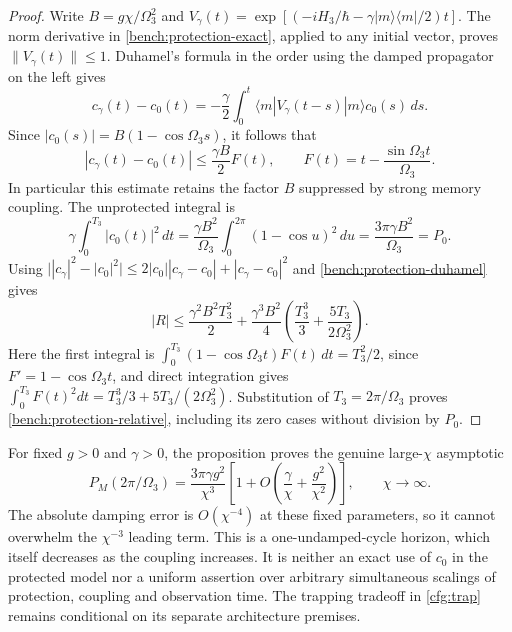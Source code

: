 \documentclass[11pt,oneside,openany]{book}
\theoremstyle{definition}
\theoremstyle{remark}\newtheorem{remark}[theorem]{Remark}
\begin{document}
\begin{proof}
Write $B=g\chi/\Omega_3^2$ and
$V_\gamma(t)=\exp[(-iH_3/\hbar-\gamma|m\rangle\langle m|/2)t]$.
The norm derivative in \eqref{bench:protection-exact}, applied to any
initial vector, proves $\|V_\gamma(t)\|\le1$. Duhamel's formula in the
order using the damped propagator on the left gives
\[
 c_\gamma(t)-c_0(t)
 =-\frac\gamma2\int_0^t
     \langle m|V_\gamma(t-s)|m\rangle c_0(s)\,ds.
\]
Since $|c_0(s)|=B(1-\cos\Omega_3s)$, it follows that
\begin{equation}
 |c_\gamma(t)-c_0(t)|\le\frac{\gamma B}{2}F(t),
 \qquad F(t)=t-\frac{\sin\Omega_3t}{\Omega_3}.
 \label{bench:protection-duhamel}
\end{equation}
In particular this estimate retains the factor $B$ suppressed by strong
memory coupling. The unprotected integral is
\[
 \gamma\int_0^{T_3}|c_0(t)|^2\,dt
  =\frac{\gamma B^2}{\Omega_3}
        \int_0^{2\pi}(1-\cos u)^2\,du
  =\frac{3\pi\gamma B^2}{\Omega_3}=P_0.
\]
Using $\bigl||c_\gamma|^2-|c_0|^2\bigr|
\le2|c_0||c_\gamma-c_0|+|c_\gamma-c_0|^2$ and
\eqref{bench:protection-duhamel} gives
\[
 |R|\le\frac{\gamma^2B^2T_3^2}{2}
       +\frac{\gamma^3B^2}{4}
            \left(\frac{T_3^3}{3}+\frac{5T_3}{2\Omega_3^2}\right).
\]
Here the first integral is
$\int_0^{T_3}(1-\cos\Omega_3t)F(t)\,dt=T_3^2/2$, since
$F'=1-\cos\Omega_3t$, and direct integration gives
$\int_0^{T_3}F(t)^2dt=T_3^3/3+5T_3/(2\Omega_3^2)$.
Substitution of $T_3=2\pi/\Omega_3$ proves
\eqref{bench:protection-relative}, including its zero cases without
division by $P_0$.
\end{proof}

For fixed $g>0$ and $\gamma>0$, the proposition proves the genuine
large-$\chi$ asymptotic
\begin{equation}
 P_M(2\pi/\Omega_3)
 =\frac{3\pi\gamma g^2}{\chi^3}
   \left[1+O\!\left(\frac\gamma\chi+\frac{g^2}{\chi^2}\right)\right],
 \qquad \chi\longrightarrow\infty.
 \label{bench:protection-asymptotic}
\end{equation}
The absolute damping error is $O(\chi^{-4})$ at these fixed parameters,
so it cannot overwhelm the $\chi^{-3}$ leading term. This is a
one-undamped-cycle horizon, which itself decreases as the coupling
increases. It is neither an exact use of $c_0$ in the protected model nor
a uniform assertion over arbitrary simultaneous scalings of protection,
coupling and observation time. The trapping tradeoff in
\eqref{cfg:trap} remains conditional on its separate architecture
premises.

\end{document}
